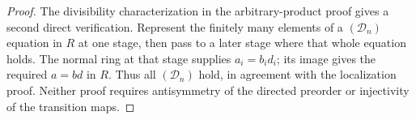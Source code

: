 \begin{proof}
The divisibility characterization in the arbitrary-product proof
gives a second direct verification. Represent the finitely many
elements of a $(\mathcal D_n)$ equation in $R$ at one stage,
then pass to a later stage where that whole equation holds.
The normal ring at that stage supplies $a_i=b_id_i$;
its image gives the required $a=bd$ in $R$. Thus all
$(\mathcal D_n)$ hold, in agreement with the localization proof.
Neither proof requires antisymmetry of the directed preorder
or injectivity of the transition maps.
\end{proof}







